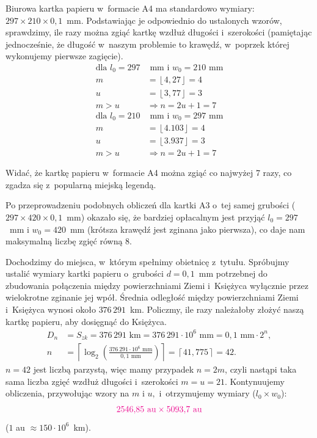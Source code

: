 	
	 Biurowa kartka papieru w~formacie A4 ma standardowo wymiary: $297 \times 210 \times 0{,}1$~mm.
	Podstawiając je odpowiednio do ustalonych wzorów, sprawdzimy, ile razy 
	można zgiąć kartkę wzdłuż długości i~szerokości 
	(pamiętając jednocześnie, że długość w~naszym problemie to krawędź, w~poprzek której wykonujemy pierwsze zagięcie).
	  \begin{align*}
		\mbox{dla }l_0=297&\text{~mm}\mbox{ i }w_0=210\text{~mm}\\
		m &= \left\lfloor4{,}27\right\rfloor = 4\\
		u &= \left\lfloor3{,}77\right\rfloor = 3\\
		m>u&\Rightarrow \boxed{n = 2u + 1 = 7}
	\end{align*}
		\begin{align*}
	\mbox{dla }l_0=210&\text{~mm}\mbox{ i }w_0=297\text{~mm}\\
	m &= \left\lfloor4.103\right\rfloor = 4\\
	u &= \left\lfloor3.937\right\rfloor = 3\\
	m>u&\Rightarrow \boxed{n = 2u + 1 = 7}
	\end{align*}
	
	Widać, że kartkę papieru w~formacie A4 można zgiąć co najwyżej 7 razy, co zgadza się z~popularną miejską legendą.
	
	 Po przeprowadzeniu podobnych obliczeń dla kartki A3 o~tej samej grubości ($297\times 420\times 0{,}1$~mm) 
	okazało się, że bardziej opłacalnym jest przyjąć $l_0=297$~mm i $w_0=420$~mm (krótsza krawędź jest zginana jako pierwsza), co daje nam maksymalną liczbę zgięć równą 8.
	
	Dochodzimy do miejsca, w~którym spełnimy obietnicę z~tytułu.
	Spróbujmy ustalić wymiary kartki papieru o~grubości $d=0{,}1$~mm 
	potrzebnej do zbudowania połączenia między powierzchniami Ziemi i~Księżyca
	wyłącznie przez wielokrotne zginanie jej wpół.
	Średnia odległość między powierzchniami Ziemi i~Księżyca wynosi około $376\,291$~km.
	Policzmy, ile razy należałoby złożyć naszą kartkę papieru, 
	aby dosięgnąć do Księżyca. 
	\begin{align*}
		D_n &= S_{zk} = 376\,291\text{~km} = 376\,291\cdot10^{6}\text{~mm} = 0{,}1\text{~mm}\cdot2^n,\\
		n &= \left\lceil\log_2\left(\frac{376\,291\cdot10^{6}\text{~mm}}{0{,}1\text{~mm}}\right)\right\rceil = \left\lceil41{,}775\right\rceil = 42.
	\end{align*}
	$n=42$ jest liczbą parzystą, więc mamy przypadek $n=2m$, czyli nastąpi taka sama
	liczba zgięć wzdłuż długości i~szerokości $m=u=21$.
	Kontynuujemy obliczenia, przywołując wzory na $m$ i $u,$ i~otrzymujemy wymiary ($l_0\times w_0$):
	\begin{gather*}
		\color{magenta}\numprint{2546}.85 \text{ au}\times\numprint{5093}.7 \text{ au}
	\end{gather*}
	($1$ au $\approx 150\cdot 10^6$~km).
	
